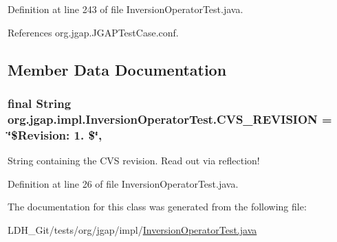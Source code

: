 Definition at line 243 of file Inversion\-Operator\-Test.\-java.



References org.\-jgap.\-J\-G\-A\-P\-Test\-Case.\-conf.



\subsection{Member Data Documentation}
\hypertarget{classorg_1_1jgap_1_1impl_1_1_inversion_operator_test_a0e5e5dd307075628fa9cacb98abc7366}{
\subsubsection[{C\-V\-S\-\_\-\-R\-E\-V\-I\-S\-I\-O\-N}]{\setlength{\rightskip}{0pt plus 5cm}final String org.\-jgap.\-impl.\-Inversion\-Operator\-Test.\-C\-V\-S\-\_\-\-R\-E\-V\-I\-S\-I\-O\-N = \char`\"{}\$Revision\-: 1. \$\char`\"{}\hspace{0.3cm}{\ttfamily [static]}, {\ttfamily [private]}}}\label{classorg_1_1jgap_1_1impl_1_1_inversion_operator_test_a0e5e5dd307075628fa9cacb98abc7366}
String containing the C\-V\-S revision. Read out via reflection! 

Definition at line 26 of file Inversion\-Operator\-Test.\-java.



The documentation for this class was generated from the following file\-:\begin{DoxyCompactItemize}
\item 
L\-D\-H\-\_\-\-Git/tests/org/jgap/impl/\hyperlink{_inversion_operator_test_8java}{Inversion\-Operator\-Test.\-java}\end{DoxyCompactItemize}
